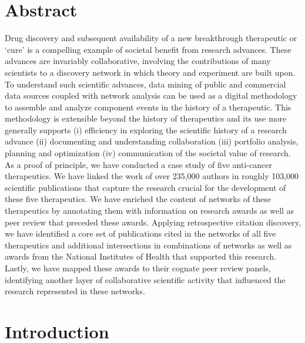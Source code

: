 \documentclass[10pt,letterpaper]{article}
\begin{document}
\section*{Abstract}

Drug discovery and subsequent availability of a new breakthrough therapeutic or `cure' is a compelling example of societal benefit from research advances. These advances are invariably collaborative, involving the contributions of many scientists to a discovery network in which theory and experiment are built upon. To understand such scientific advances, data mining of public and commercial data sources coupled with network analysis can be used as a digital methodology to assemble and analyze component events in the history of a therapeutic. This methodology is extensible beyond the history of therapeutics and its use more generally supports (i) efficiency in  exploring  the scientific history of a research advance (ii) documenting and understanding collaboration (iii) portfolio analysis, planning and optimization (iv) communication of the societal value of research.  As a proof of principle, we have conducted a case study of five anti-cancer therapeutics. We have linked the work of over 235,000 authors in roughly 103,000 scientific publications that capture the research crucial for the development of these five therapeutics. We have enriched the content of networks of these therapeutics by annotating them with information on research awards as well as peer review that preceded these awards. Applying retrospective citation discovery, we have identified a core set of publications cited in the networks of all five therapeutics and additional intersections in combinations of networks as well as awards from the National Institutes of Health that supported this research. Lastly, we have mapped these awards to their cognate peer review panels, identifying another layer of collaborative scientific activity that influenced the research represented in these networks. 

\linenumbers

\section*{Introduction}
\end{document}
